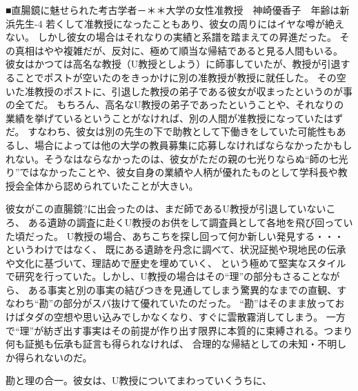 ■直腸鏡に魅せられた考古学者－＊＊大学の女性准教授　神崎優香子　年齢は新浜先生-4
若くして准教授になったこともあり、彼女の周りにはイヤな噂が絶えない。
しかし彼女の場合はそれなりの実績と系譜を踏まえての昇進だった。
その真相はやや複雑だが、反対に、極めて順当な帰結であると見る人間もいる。
彼女はかつては高名な教授（U教授としよう）に師事していたが、教授が引退することでポストが空いたのをきっかけに別の准教授が教授に就任した。
その空いた准教授のポストに、引退した教授の弟子である彼女が収まったというのが事の全てだ。
もちろん、高名なU教授の弟子であったということや、それなりの業績を挙げているということがなければ、別の人間が准教授になっていたはずだ。
すなわち、彼女は別の先生の下で助教として下働きをしていた可能性もあるし、場合によっては他の大学の教員募集に応募しなければならなかったかもしれない。そうなはならなかったのは、彼女がただの親の七光りならぬ“師の七光り”ではなかったことや、彼女自身の業績や人柄が優れたものとして学科長や教授会全体から認められていたことが大きい。

彼女がこの直腸鏡?に出会ったのは、まだ師であるU教授が引退していないころ、
ある遺跡の調査に赴くU教授のお供をして調査員として各地を飛び回っていた頃だった。
U教授の場合、あちこちを探し回って何か新しい発見する・・・というわけではなく、
既にある遺跡を丹念に調べて、状況証拠や現地民の伝承や文化に基づいて、理詰めで歴史を埋めていく、
という極めて堅実なスタイルで研究を行っていた。しかし、U教授の場合はその“理”の部分もさることながら、
ある事実と別の事実の結びつきを見通してしまう驚異的なまでの直観、すなわち“勘”の部分がスバ抜けて優れていたのだった。
“勘”はそのまま放っておけばタダの空想や思い込みでしかなくなり、すぐに雲散霧消してしまう。
一方で“理”が紡ぎ出す事実はその前提が作り出す限界に本質的に束縛される。つまり何も証拠も伝承も証言も得られなければ、
合理的な帰結としての未知・不明しか得られないのだ。

勘と理の合一。彼女は、U教授についてまわっていくうちに、

